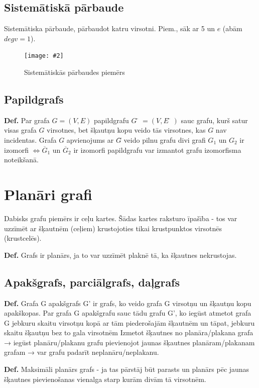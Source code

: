 \documentclass{article}
\newcommand{\illustration}[3]{
	\begin{figure}[H]
		\centering	
		\texttt{[image: \#2]}
		\caption{#3}
	\end{figure}
}
\begin{document}
\subsection{Sistemātiskā pārbaude}

Sistemātiska pārbaude, pārbaudot katru virsotni. Piem., sāk ar 5 un $e$ (abām $degv=1$).
\illustration{1}{isomorphism-1}{Sistemātiskās pārbaudes piemērs}

\subsection{Papildgrafs}

\textbf{Def.}  Par grafa $G=(V , E )$ papildgrafu $Ḡ = (V , Ē )$ sauc grafu, kurš satur visas grafa $G$ virsotnes, bet šķautņu kopu veido tās virsotnes, kas $G$ nav incidentas.  Grafa $G$ apvienojums ar $G$̄ veido pilnu grafu divi grafi $G_1$ un $G_2$ ir izomorfi $\Leftrightarrow \overline{G}_1 $ un $ \overline{G}_2$ ir izomorfi papildgrafu var izmantot grafu izomorfisma noteikšanā.

\section{Planāri grafi}
Dabisks grafu piemērs ir ceļu kartes. Šādas kartes raksturo īpašība - tos var uzzīmēt ar šķautnēm (ceļiem) krustojoties tikai krustpunktos virsotnēs (krustcelēs).

\textbf{Def.}  Grafs ir planārs, ja to var uzzīmēt plaknē tā, ka šķautnes nekrustojas. 

\subsection{Apakšgrafs, parciālgrafs, daļgrafs}
\textbf{Def.}  Grafa G apakšgrafs G' ir grafs, ko veido grafa G virsotņu un šķautņu kopu apakškopas.  Par grafa G apakšgrafu sauc tādu grafu G', ko iegūst atmetot grafa G jebkuru skaitu virsotņu kopā ar tām piederošajām šķautnēm un tāpat, jebkuru skaitu šķautņu bez to gala virsotnēm
Izmetot šķautnes no planāra/plakana grafa → iegūst planāru/plakanu grafu pievienojot jaunas šķautnes planāram/plakanam grafam → var grafu padarīt neplanāru/neplakanu. 

\textbf{Def.}  Maksimāli planārs grafs - ja tas pārstāj būt parasts un planārs pēc jaunas šķautnes pievienošanas vienalga starp kurām divām tā virsotnēm.
\end{document}
